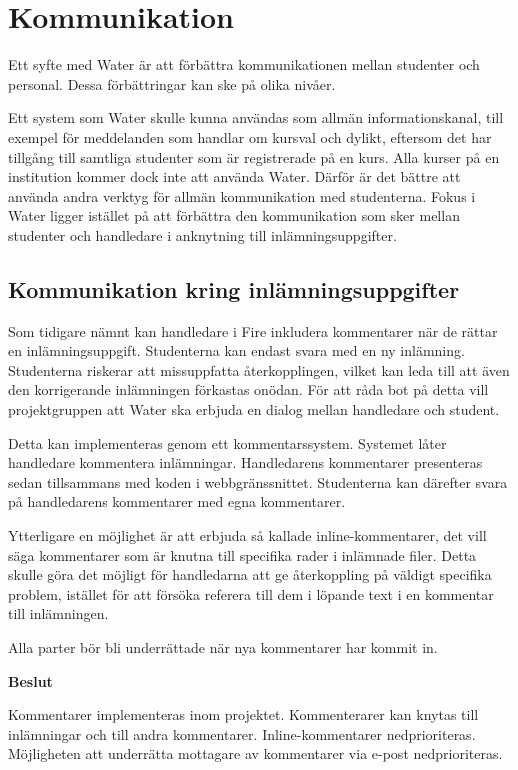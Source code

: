 \section{Kommunikation}

Ett syfte med Water är att förbättra kommunikationen mellan studenter och personal. Dessa förbättringar kan ske på olika nivåer.

Ett system som Water skulle kunna användas som allmän informationskanal, till exempel för meddelanden som handlar om kursval och dylikt,  eftersom det har tillgång till samtliga studenter som är registrerade på en kurs. Alla kurser på en institution kommer dock inte att använda Water. Därför är det bättre att använda andra verktyg för allmän kommunikation med studenterna. Fokus i Water ligger istället på att förbättra den kommunikation som sker mellan studenter och handledare i anknytning till inlämningsuppgifter.

\subsection{Kommunikation kring inlämningsuppgifter}
Som tidigare nämnt kan handledare i Fire inkludera kommentarer när de rättar en inlämningsuppgift. Studenterna kan endast svara med en ny inlämning. Studenterna riskerar att missuppfatta återkopplingen, vilket kan leda till att även den korrigerande inlämningen förkastas onödan. För att råda bot på detta vill projektgruppen att Water ska erbjuda en dialog mellan handledare och student.

Detta kan implementeras genom ett kommentarssystem. Systemet låter handledare kommentera inlämningar. Handledarens kommentarer presenteras sedan tillsammans med koden i webbgränssnittet. Studenterna kan därefter svara på handledarens kommentarer med egna kommentarer.

Ytterligare en möjlighet är att erbjuda så kallade inline-kommentarer, det vill säga kommentarer som är knutna till specifika rader i inlämnade filer. Detta skulle göra det möjligt för handledarna att ge återkoppling på väldigt specifika problem, istället för att försöka referera till dem i löpande text i en kommentar till inlämningen.

Alla parter bör bli underrättade när nya kommentarer har kommit in.

\begin{flushright}
  
  \textbf{Beslut}
  
  Kommentarer implementeras inom projektet. Kommenterarer kan knytas till inlämningar och till andra kommentarer. Inline-kommentarer nedprioriteras. Möjligheten att underrätta mottagare av kommentarer via e-post nedprioriteras.
  
\end{flushright}
